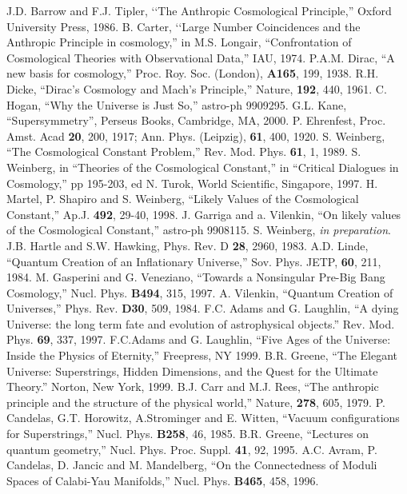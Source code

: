 \documentclass{article}
\begin{document}
\begin{thebibliography}{99}
 J.D. Barrow and F.J. Tipler, \lq\lq The Anthropic
Cosmological Principle,'' Oxford University Press, 1986.
 B. Carter, \lq\lq Large Number Coincidences and the
Anthropic Principle in cosmology,'' in M.S. Longair, ``Confrontation
of Cosmological Theories with Observational Data,'' IAU, 1974.
 P.A.M. Dirac, ``A new basis for cosmology,'' Proc. Roy.
Soc. (London), {\bf A165}, 199, 1938.
 R.H. Dicke, ``Dirac's Cosmology and Mach's
Principle,'' Nature, {\bf 192}, 440, 1961.
 C. Hogan, ``Why the Universe is Just So,''
astro-ph 9909295.
 G.L. Kane, ``Supersymmetry'', Perseus Books,
Cambridge, MA, 2000.
 P. Ehrenfest, Proc. Amst. Acad {\bf 20}, 200, 1917;
Ann. Phys. (Leipzig), {\bf 61}, 400, 1920.
 S. Weinberg, ``The Cosmological Constant Problem,''
Rev. Mod. Phys. {\bf 61}, 1, 1989.
 S. Weinberg, in ``Theories of the Cosmological Constant,''
in ``Critical Dialogues in Cosmology,''  pp 195-203, ed N. Turok, 
World Scientific, Singapore, 1997.
 H. Martel, P. Shapiro and S. Weinberg, ``Likely Values of
the Cosmological Constant,'' Ap.J. {\bf 492}, 29-40, 1998.
 J. Garriga and a. Vilenkin, ``On likely values of the
Cosmological Constant,'' astro-ph 9908115.
 S. Weinberg, {\it in preparation}.
 J.B. Hartle and S.W. Hawking, Phys. Rev. D {\bf 28},
2960, 1983.
 A.D. Linde, ``Quantum Creation of an Inflationary Universe,''
Sov. Phys. JETP, {\bf 60}, 211, 1984.
 M. Gasperini and G. Veneziano, ``Towards a Nonsingular Pre-Big
Bang Cosmology,'' Nucl. Phys. {\bf B494}, 315, 1997.
 A. Vilenkin, ``Quantum Creation of Universes,''
Phys. Rev. {\bf D30}, 509, 1984.
 F.C. Adams and G. Laughlin, ``A dying Universe:
the long term fate and evolution of astrophysical objects.''
Rev. Mod. Phys. {\bf 69}, 337,
1997.
 F.C.Adams and G. Laughlin, ``Five Ages of the Universe:
Inside the Physics of Eternity,''
Freepress, NY 1999.
 B.R. Greene, ``The Elegant Universe: Superstrings, Hidden 
Dimensions, and the Quest for the Ultimate Theory.'' Norton, New York, 1999.
 B.J. Carr and M.J. Rees, ``The anthropic principle
and the structure of the physical world,'' Nature, {\bf 278}, 605, 1979.
 P. Candelas, G.T. Horowitz, A.Strominger and E. Witten,
``Vacuum configurations for Superstrings,'' Nucl. Phys. {\bf B258}, 46, 1985.
 B.R. Greene, ``Lectures on quantum geometry,'' Nucl. Phys.
Proc. Suppl. {\bf 41}, 92, 1995.
 A.C. Avram, P. Candelas, D. Jancic and M. Mandelberg,
``On the Connectedness of Moduli Spaces of Calabi-Yau Manifolds,''
Nucl. Phys. {\bf B465}, 458, 1996.

\end{thebibliography}
\end{document}
